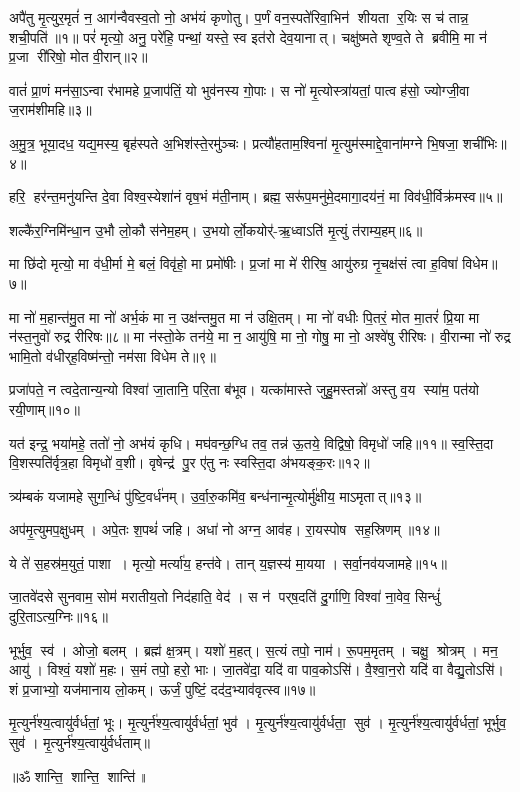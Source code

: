 
अपै॑तु मृ॒त्युर॒मृतं॑ न॒ आग॑न्वैवस्व॒तो नो॒ अभ॑यं कृणोतु।
प॒र्णं वन॒स्पते॑रिवा॒भिन॑ शीयता र॒यिः स च॑ तान्न॒ शची॒पति॑॥१॥
परं॑ मृत्यो॒ अनु॒ परे॑हि॒ पन्थां॒ यस्ते॒ स्व इत॑रो देव॒यानात्।
चक्षु॑ष्मते शृण्व॒ते ते ब्रवीमि॒ मा न॑ प्र॒जा री॑रिषो॒ मोत वी॒रान्॥२॥

वातं॑ प्रा॒णं मन॑सा॒ऽन्वा र॑भामहे प्र॒जाप॑तिं॒ यो भुव॑नस्य गो॒पाः।
स नो॑ मृ॒त्योस्त्रा॑यतां॒ पात्वह॑सो॒ ज्योग्जी॒वा ज॒राम॑शीमहि॥३॥

अ॒मु॒त्र॒ भूया॒दध॒ यद्य॒मस्य॒ बृह॑स्पते अ॒भिश॑स्ते॒रमु॑ञ्चः।
प्रत्यौ॑हताम॒श्विना॑ मृ॒त्युम॑स्माद्दे॒वाना॑मग्ने भि॒षजा॒ शची॑भिः॥४॥

हरि॒ हर॑न्त॒मनु॑यन्ति दे॒वा विश्व॒स्येशा॑नं वृष॒भं म॑ती॒नाम्।
ब्रह्म॒ सरू॑प॒मनु॑मे॒दमागा॒दय॑नं॒ मा विव॑धी॒र्विक्र॑मस्व॥५॥

शल्कै॑र॒ग्निमि॑न्धा॒न उ॒भौ लो॒कौ स॑नेम॒हम्।
उ॒भयोर्लो॒कयोर्॑-ऋ॒ध्वाऽति॑ मृ॒त्युं त॑राम्य॒हम्॥६॥

मा छि॑दो मृत्यो॒ मा व॑धी॒र्मा मे॒ बलं॒ विवृ॑हो॒ मा प्रमो॑षीः।
प्र॒जां मा मे॑ रीरिष॒ आयु॑रुग्र नृ॒चक्ष॑सं त्वा ह॒विषा॑ विधेम॥७॥

मा नो॑ म॒हान्त॑मु॒त मा नो॑ अर्भ॒कं मा न॒ उक्ष॑न्तमु॒त मा न॑ उक्षि॒तम्।
 मा नो॑ वधीः पि॒तरं॒ मोत मा॒तरं॑ प्रि॒या मा न॑स्त॒नुवो॑ रुद्र रीरिषः॥८॥
 मा न॑स्तो॒के तन॑ये॒ मा न॒ आयु॑षि॒ मा नो॒ गोषु॒ मा नो॒ अश्वे॑षु रीरिषः।
 वी॒रान्मा नो॑ रुद्र भामि॒तो व॑धीर्‌ह॒विष्म॑न्तो॒ नम॑सा विधेम ते॥९॥

प्रजा॑पते॒ न त्वदे॒तान्य॒न्यो विश्वा॑ जा॒तानि॒ परि॒ता ब॑भूव।
यत्का॑मास्ते जुहु॒मस्तन्नो॑ अस्तु व॒य स्या॑म॒ पत॑यो रयी॒णाम्॥१०॥

यत॑ इन्द्र॒ भया॑महे॒ ततो॑ नो॒ अभ॑यं कृधि।
मघ॑वन्छ॒ग्धि तव॒ तन्न॑ ऊ॒तये॒ विद्विषो॒ विमृधो॑ जहि॥११॥
स्व॒स्ति॒दा वि॒शस्पति॑र्वृत्र॒हा विमृधो॑ व॒शी।
वृषेन्द्र॑ पु॒र ए॑तु नः स्वस्ति॒दा अ॑भयङ्क॒रः॥१२॥

त्र्य॑म्बकं यजामहे सुग॒न्धिं पु॑ष्टि॒वर्ध॑नम्।
 उ॒र्वा॒रु॒कमि॑व॒ बन्ध॑नान्मृ॒त्योर्मु॑क्षीय॒ माऽमृतात्॥१३॥

अप॑मृ॒त्युमप॒क्षुधम्।   अपे॒तः श॒पथं॑ जहि।
अधा॑ नो अग्न॒ आव॑ह।   रा॒यस्पोष सह॒स्रिणम्॥१४॥

ये ते॑ स॒हस्र॑म॒युतं॒ पाशा।   मृत्यो॒ मर्त्या॑य॒ हन्त॑वे।
तान् य॒ज्ञस्य॑ मा॒यया।   सर्वा॒नव॑यजामहे॥१५॥

जा॒तवे॑दसे सुनवाम॒ सोम॑ मरातीय॒तो निद॑हाति॒ वेद॑।
स न॑ पर्‌ष॒दति॑ दु॒र्गाणि॒ विश्वा॑ ना॒वेव॒ सिन्धुं॑ दुरि॒ताऽत्य॒ग्निः॥१६॥

भूर्भुव॒ स्व॑।
ओजो॒ बलम्।
ब्रह्म॑ क्ष॒त्रम्।
यशो॑ म॒हत्।
स॒त्यं तपो॒ नाम॑।
रू॒पम॒मृतम्।
चक्षु॒ श्रोत्रम्।
मन॒ आयु॑।
विश्वं॒ यशो॑ म॒हः।
स॒मं तपो॒ हरो॒ भाः।
जा॒तवे॑दा॒ यदि॑ वा पाव॒कोऽसि॑।
वै॒श्वा॒न॒रो यदि॑ वा वैद्यु॒तोऽसि॑।
शं प्र॒जाभ्यो॒ यज॑मानाय लो॒कम्।
ऊर्जं॒ पुष्टिं॒ दद॑द॒भ्याव॑वृत्स्व॥१७॥
   
मृ॒त्युर्न॑श्य॒त्वायु॑र्वर्धतां॒ भूः।
मृ॒त्युर्न॑श्य॒त्वायु॑र्वर्धतां॒ भुव॑।
मृ॒त्युर्न॑श्य॒त्वायु॑र्वर्धता॒ सुव॑।
मृ॒त्युर्न॑श्य॒त्वायु॑र्वर्धतां॒ भूर्भुव॒ सुव॑।
मृ॒त्युर्न॑श्य॒त्वायु॑र्वर्धताम्॥\\

\centerline{॥ॐ शान्ति॒ शान्ति॒ शान्ति॑॥}
